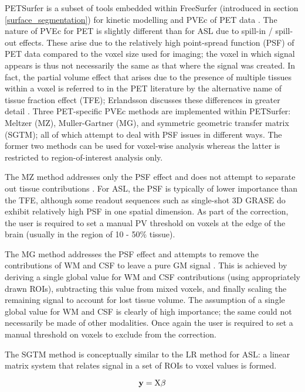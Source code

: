 PETSurfer is a subset of tools embedded within FreeSurfer (introduced in section \ref{surface_segmentation}) for kinetic modelling and PVEc of PET data \cite{Greve2016}. The nature of PVEc for PET is slightly different than for ASL due to spill-in / spill-out effects. These arise due to the relatively high point-spread function (PSF) of PET data compared to the voxel size used for imaging; the voxel in which signal appears is thus not necessarily the same as that where the signal was created. In fact, the partial volume effect that arises due to the presence of multiple tissues within a voxel is referred to in the PET literature by the alternative name of tissue fraction effect (TFE); Erlandsson discusses these differences in greater detail \cite{Erlandsson2012}. Three PET-specific PVEc methods are implemented within PETSurfer: Meltzer (MZ), Muller-Gartner (MG), and symmetric geometric transfer matrix (SGTM); all of which attempt to deal with PSF issues in different ways. The former two methods can be used for voxel-wise analysis whereas the latter is restricted to region-of-interest analysis only. 

The MZ method addresses only the PSF effect and does not attempt to separate out tissue contributions \cite{Meltzer1990}. For ASL, the PSF is typically of lower importance than the TFE, although some readout sequences such as single-shot 3D GRASE do exhibit relatively high PSF in one spatial dimension. As part of the correction, the user is required to set a manual PV threshold on voxels at the edge of the brain (usually in the region of 10 - 50\% tissue). 

The MG method addresses the PSF effect and attempts to remove the contributions of WM and CSF to leave a pure GM signal \cite{Muller-Gartner1992a}. This is achieved by deriving a single global value for WM and CSF contributions (using appropriately drawn ROIs), subtracting this value from mixed voxels, and finally scaling the remaining signal to account for lost tissue volume. The assumption of a single global value for WM and CSF is clearly of high importance; the same could not necessarily be made of other modalities. Once again the user is required to set a manual threshold on voxels to exclude from the correction. 

The SGTM method \cite{Labbe1998} is conceptually similar to the LR method for ASL: a linear matrix system that relates signal in a set of ROIs to voxel values is formed. 

\begin{equation}
\mathbf{y} = \mathrm{X}\mathbf{\beta}
\end{equation}


